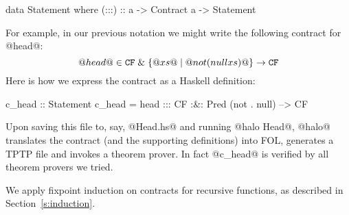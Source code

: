 \begin{code}
data Statement where
    (:::) :: a -> Contract a -> Statement
\end{code}
For example, in our previous notation we might write the following
contract for @head@:
$$
@head@ \in {\tt CF} \;\&\; \{@xs@ \mid @not (null xs)@ \} \rightarrow {\tt CF}
$$
Here is how we express the contract as a Haskell definition:
\begin{comment}
head (x:xs) = x
head []     = error "empty list"

not True = False    null [] = True
not False = True    null xs = False

f . g = \x -> f (g x)
\end{comment}
\begin{code}
c_head :: Statement
c_head = head ::: CF :&: Pred (not . null) --> CF
\end{code}
Upon saving this file to, say, @Head.hs@ and running @halo Head@,
@halo@ translates the contract (and the supporting definitions) into
FOL, generates a TPTP file and invokes a theorem prover.
In fact @c_head@ is verified by all theorem provers we tried.

We apply fixpoint induction on contracts for recursive functions, as
described in Section~\ref{s:induction}.

